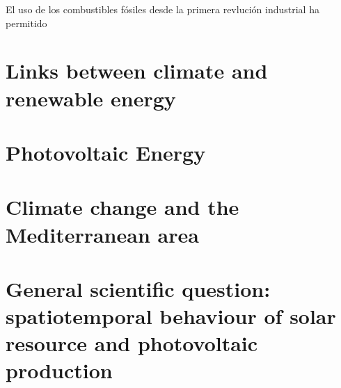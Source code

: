 El uso de los combustibles fósiles desde la primera revlución industrial ha permitido



\section{Links between climate and renewable energy}


\section{Photovoltaic Energy}
\section{Climate change and the Mediterranean area}
\section{General scientific question: spatiotemporal behaviour of solar resource and photovoltaic production}
